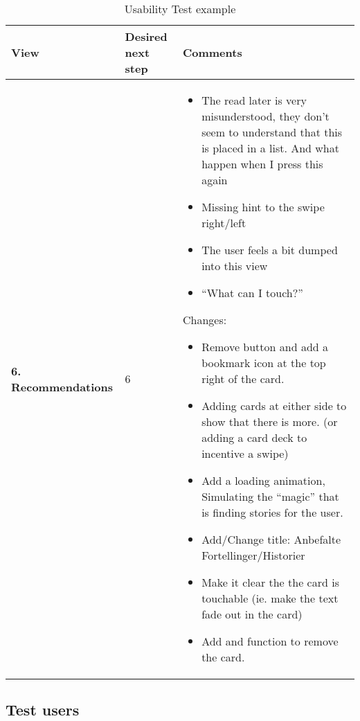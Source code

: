 \renewcommand{\arraystretch}{2}%
\begin{center}
	\begin{longtable}{ | p{4cm} | p{3cm} | p{9cm}|}
		
		\caption[Usability test]{Usability Test example } \label{Tab:usabilityTestexample}\\
		\label{Tab:usabilitytestexample}
		\textbf{View} & \textbf{Desired next step} & \textbf{Comments}
		\\ \hline
		
		\textbf{6. Recommendations} & 6 & 
		\begin{itemize}
			
			\item The read later is very misunderstood, they don’t seem to understand that this is placed in a list. And what happen when I press this again
			\item Missing hint to the swipe right/left
			\item The user feels a bit dumped into this view
			\item “What can I touch?”
		\end{itemize}
		Changes:
		\begin{itemize}
			\item Remove button and add a bookmark icon at the top right of the card. 
			\item Adding cards at either side to show that there is more. (or adding a card deck to incentive a swipe)
			\item Add a loading animation, Simulating the “magic” that is finding stories for the user.
			\item Add/Change title: Anbefalte Fortellinger/Historier
			\item Make it clear the the card is touchable (ie. make the text fade out in the card)
			\item Add and function to remove the card.
		\end{itemize}
		\\\hline
	\end{longtable}
\end{center}

\subsection{Test users}

